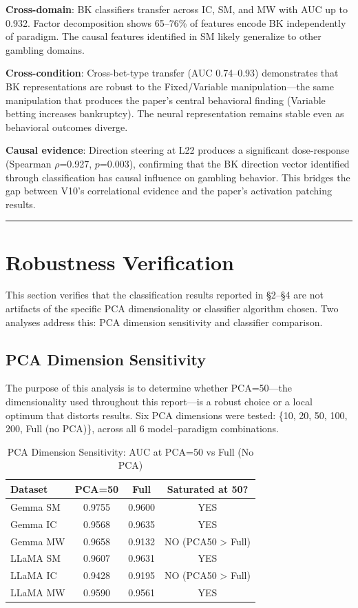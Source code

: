\documentclass[11pt,a4paper]{article}
\begin{document}
\textbf{Cross-domain}: BK classifiers transfer across IC, SM, and MW with AUC up to 0.932. Factor decomposition shows 65--76\% of features encode BK independently of paradigm. The causal features identified in SM likely generalize to other gambling domains.

\textbf{Cross-condition}: Cross-bet-type transfer (AUC 0.74--0.93) demonstrates that BK representations are robust to the Fixed/Variable manipulation---the same manipulation that produces the paper's central behavioral finding (Variable betting increases bankruptcy). The neural representation remains stable even as behavioral outcomes diverge.

\textbf{Causal evidence}: Direction steering at L22 produces a significant dose-response (Spearman $\rho$=0.927, $p$=0.003), confirming that the BK direction vector identified through classification has causal influence on gambling behavior. This bridges the gap between V10's correlational evidence and the paper's activation patching results.

\bigskip\hrule\bigskip

\section{Robustness Verification}\label{sec:robustness}

This section verifies that the classification results reported in \S2--\S4 are not artifacts of the specific PCA dimensionality or classifier algorithm chosen. Two analyses address this: PCA dimension sensitivity and classifier comparison.

\subsection{PCA Dimension Sensitivity}

The purpose of this analysis is to determine whether PCA=50---the dimensionality used throughout this report---is a robust choice or a local optimum that distorts results. Six PCA dimensions were tested: \{10, 20, 50, 100, 200, Full (no PCA)\}, across all 6 model--paradigm combinations.

\begin{table}[H]
\centering
\caption{PCA Dimension Sensitivity: AUC at PCA=50 vs Full (No PCA)}
\begin{tabular}{lccc}
\toprule
\textbf{Dataset} & \textbf{PCA=50} & \textbf{Full} & \textbf{Saturated at 50?} \\
\midrule
Gemma SM & 0.9755 & 0.9600 & YES \\
Gemma IC & 0.9568 & 0.9635 & YES \\
Gemma MW & 0.9658 & 0.9132 & NO (PCA50 > Full) \\
LLaMA SM & 0.9607 & 0.9631 & YES \\
LLaMA IC & 0.9428 & 0.9195 & NO (PCA50 > Full) \\
LLaMA MW & 0.9590 & 0.9561 & YES \\
\bottomrule
\end{tabular}
\end{table}
\end{document}
